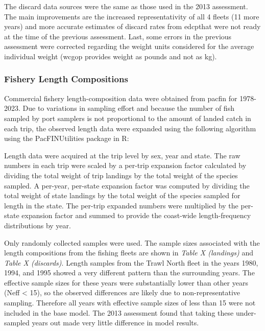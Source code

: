 \documentclass[11pt,
  english,
  letterpaper,
]{article}
\begin{document}
The discard data sources were the same as those used in the 2013 assessment. The main improvements are the increased representativity of all 4 fleets (11 more years) and more accurate estimates of discard rates from \gls{edcp}that were not ready at the time of the previous assessment. Last, some errors in the previous assessment were corrected regarding the weight units considered for the average individual weight (\gls{wcgop} provides weight as pounds and not as kg).

\hypertarget{fishery-length-compositions}{%
\subsubsection{Fishery Length Compositions}\label{fishery-length-compositions}}

Commercial fishery length-composition data were obtained from \gls{pacfin} for 1978-2023. Due to variations in sampling effort and because the number of fish sampled by port samplers is not proportional to the amount of landed catch in each trip, the observed length data were expanded using the following algorithm using the PacFINUtilities package in R:

Length data were acquired at the trip level by sex, year and state. The raw numbers in each trip were scaled by a per-trip expansion factor calculated by dividing the total weight of trip landings by the total weight of the species sampled. A per-year, per-state expansion factor was computed by dividing the total weight of state landings by the total weight of the species sampled for length in the state. The per-trip expanded numbers were multiplied by the per-state expansion factor and summed to provide the coast-wide length-frequency distributions by year.

Only randomly collected samples were used. The sample sizes associated with the length compositions from the fishing fleets are shown in \emph{\emph{Table X (landings)}} and \emph{\emph{Table X (discards)}}. Length samples from the Trawl North fleet in the years 1980, 1994, and 1995 showed a very different pattern than the surrounding years. The effective sample sizes for these years were substantially lower than other years (Neff \textless{} 15), so the observed differences are likely due to non-representative sampling. Therefore all years with effective sample sizes of less than 15 were not included in the base model. The 2013 assessment found that taking these under-sampled years out made very little difference in model results.
\end{document}
